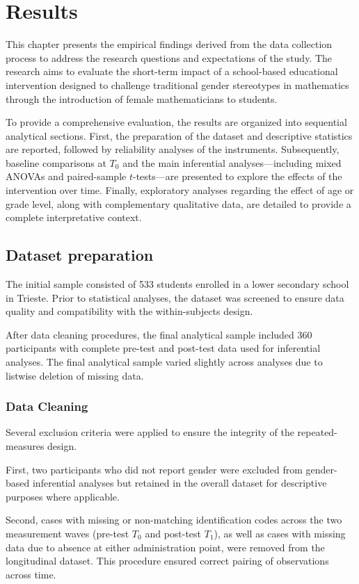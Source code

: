 \chapter{Results}
This chapter presents the empirical findings derived from the data collection process to address the research questions and expectations of the study. The research aims to evaluate the short-term impact of a school-based educational intervention designed to challenge traditional gender stereotypes in mathematics through the introduction of female mathematicians to students.

To provide a comprehensive evaluation, the results are organized into sequential analytical sections. First, the preparation of the dataset and descriptive statistics are reported, followed by reliability analyses of the instruments. Subsequently, baseline comparisons at $T_0$ and the main inferential analyses—including mixed ANOVAs and paired-sample $t$-tests—are presented to explore the effects of the intervention over time. Finally, exploratory analyses regarding the effect of age or grade level, along with complementary qualitative data, are detailed to provide a complete interpretative context.

\section{Dataset preparation}
The initial sample consisted of 533 students enrolled in a lower secondary school in Trieste. Prior to statistical analyses, the dataset was screened to ensure data quality and compatibility with the within-subjects design.

After data cleaning procedures, the final analytical sample included 360 participants with complete pre-test and post-test data used for inferential analyses. The final analytical sample varied slightly across analyses due to listwise deletion of missing data.

\subsection{Data Cleaning}
Several exclusion criteria were applied to ensure the integrity of the repeated-measures design.

First, two participants who did not report gender were excluded from gender-based inferential analyses but retained in the overall dataset for descriptive purposes where applicable.

Second, cases with missing or non-matching identification codes across the two measurement waves (pre-test $T_0$ and post-test $T_1$), as well as cases with missing data due to absence at either administration point, were removed from the longitudinal dataset. This procedure ensured correct pairing of observations across time.

